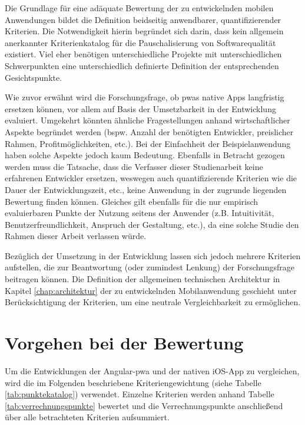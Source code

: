 
Die Grundlage für eine adäquate Bewertung der zu entwickelnden mobilen Anwendungen bildet die Definition beidseitig anwendbarer, quantifizierender Kriterien. Die Notwendigkeit hierin begründet sich darin, dass kein allgemein anerkannter Kriterienkatalog für die Pauschalisierung von Softwarequalität existiert. Viel eher benötigen unterschiedliche Projekte mit unterschiedlichen Schwerpunkten eine unterschiedlich definierte Definition der entsprechenden Gesichtspunkte.

Wie zuvor erwähnt wird die Forschungsfrage, ob \acp{pwa} native Apps langfristig ersetzen können, vor allem auf Basis der Umsetzbarkeit in der Entwicklung evaluiert. Umgekehrt könnten ähnliche Fragestellungen anhand wirtschaftlicher Aspekte begründet werden (bspw. Anzahl der benötigten Entwickler, preislicher Rahmen, Profitmöglichkeiten, etc.). Bei der Einfachheit der Beispielanwendung haben solche Aspekte jedoch kaum Bedeutung. Ebenfalls in Betracht gezogen werden muss die Tatsache, dass die Verfasser dieser Studienarbeit keine erfahrenen Entwickler ersetzen, weswegen auch quantifizierende Kriterien wie die Dauer der Entwicklungszeit, etc., keine Anwendung in der zugrunde liegenden Bewertung finden können. Gleiches gilt ebenfalls für die nur empirisch evaluierbaren Punkte der Nutzung seitens der Anwender (z.B. Intuitivität, Benutzerfreundlichkeit, Anspruch der Gestaltung, etc.), da eine solche Studie den Rahmen dieser Arbeit verlassen würde.

Bezüglich der Umsetzung in der Entwicklung lassen sich jedoch mehrere Kriterien aufstellen, die zur Beantwortung (oder zumindest Lenkung) der Forschungsfrage beitragen können. Die Definition der allgemeinen technischen Architektur in Kapitel \ref{chap:architektur} der zu entwickelnden Mobilanwendung geschieht unter Berücksichtigung der Kriterien, um eine neutrale Vergleichbarkeit zu ermöglichen.
\newpage
\section{Vorgehen bei der Bewertung}
Um die Entwicklungen der Angular-\ac{pwa} und der nativen iOS-App zu vergleichen, wird die im Folgenden beschriebene Kriteriengewichtung (siehe Tabelle \ref{tab:punktekatalog}) verwendet. Einzelne Kriterien werden anhand Tabelle \ref{tab:verrechnungspunkte} bewertet und die Verrechnungspunkte anschließend über alle betrachteten Kriterien aufsummiert.

